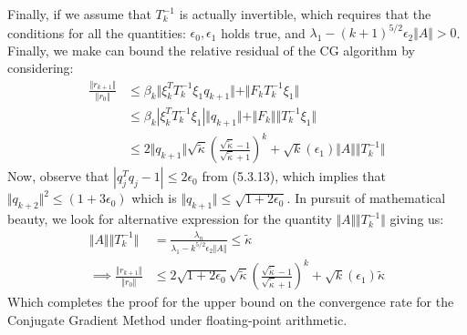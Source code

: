 \documentclass[]{article}
\theoremstyle{definition}
\begin{document}
            Finally, if we assume that $T_k^{-1}$ is actually invertible, which requires that the conditions for all the quantities: $\epsilon_0, \epsilon_1$ holds true, and $\lambda_1 - (k + 1)^{5/2} \epsilon_2\Vert A\Vert > 0$. Finally, we make can bound the relative residual of the CG algorithm by considering: 
            \begin{align}
                \frac{\Vert r_{k + 1}\Vert}
                {
                    \Vert r_0\Vert
                } &\le
                \beta_k \Vert
                    \xi_k^T T_k^{-1}\xi_1 q_{k + 1}
                \Vert + 
                \Vert F_kT_k^{-1}\xi_1 \Vert
                \\
                & \le 
                \beta_k|\xi_k^T T_k^{-1}\xi_1|
                \Vert q_{k + 1}\Vert + 
                \Vert F_k\Vert  \Vert T^{-1}_k\xi_1\Vert
                \\
                & \le 
                2 \Vert q_{k + 1}\Vert\sqrt{\tilde{\kappa}}
                    \left(
                        \frac{\sqrt{\tilde{\kappa}} - 1}{\sqrt{\tilde{\kappa}} + 1}
                    \right)^k
                + 
                \sqrt{k}(\epsilon_1) \Vert A\Vert 
                \Vert T^{-1}_k\Vert
            \end{align}
            Now, observe that $|q_j^Tq_j - 1|\le 2\epsilon_0$ from (5.3.13), which implies that $\Vert q_{k + 2}\Vert^2 \le (1 + 3\epsilon_0)$ which is $\Vert q_{k + 1}\Vert \le \sqrt{1 + 2\epsilon_0}$. In pursuit of mathematical beauty, we look for alternative expression for the quantity $\Vert A\Vert \Vert T^{-1}_k\Vert$ giving us: 
            \begin{align}
                \Vert A\Vert\Vert T_k^{-1}\Vert &= \frac{\lambda_n}{\lambda_1 - k^{5/2}\epsilon_2\Vert A\Vert} \le \tilde{\kappa}
                \\
                \implies 
                \frac{\Vert r_{k + 1}\Vert}
                {
                    \Vert r_0\Vert
                } &\le 
                2  \sqrt{1 + 2\epsilon_0}\sqrt{\tilde{\kappa}}
                    \left(
                        \frac{\sqrt{\tilde{\kappa}} - 1}{\sqrt{\tilde{\kappa}} + 1}
                    \right)^k
                + \sqrt{k}(\epsilon_1) \tilde{\kappa}
            \end{align}
            Which completes the proof for the upper bound on the convergence rate for the Conjugate Gradient Method under floating-point arithmetic. 
\end{document}
